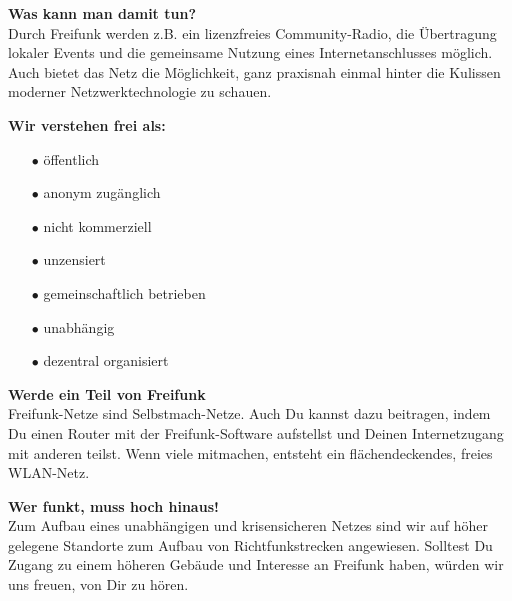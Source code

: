 \documentclass[a4paper]{article}
\begin{document}
\begin{Row}
    \begin{Cell}{5}
      \textbf{Was kann man damit tun?} \\
      Durch Freifunk werden z.B. ein lizenzfreies Community-Radio, die Übertragung
      lokaler Events und die gemeinsame Nutzung eines Internetanschlusses möglich.
      Auch bietet das Netz die Möglichkeit, ganz praxisnah einmal hinter die
      Kulissen moderner Netzwerktechnologie zu schauen.
    \end{Cell}
    \begin{Cell}{4}
      \textbf{Wir verstehen frei als:} \vspace*{-0.18cm}
	    \begin{itemize}
        \item[\textcolor{freifunkpink}{\Large$\bullet$}] öffentlich \vspace*{-0.3cm}
        \item[\textcolor{freifunkpink}{\Large$\bullet$}] anonym zugänglich \vspace*{-0.3cm}
        \item[\textcolor{freifunkpink}{\Large$\bullet$}] nicht kommerziell \vspace*{-0.3cm}
        \item[\textcolor{freifunkpink}{\Large$\bullet$}] unzensiert \vspace*{-0.3cm}
        \item[\textcolor{freifunkpink}{\Large$\bullet$}] gemeinschaftlich betrieben\vspace*{-0.3cm}
        \item[\textcolor{freifunkpink}{\Large$\bullet$}] unabhängig\vspace*{-0.3cm}
        \item[\textcolor{freifunkpink}{\Large$\bullet$}] dezentral organisiert
    	\end{itemize}
    \end{Cell}
\end{Row}

\newpage
\thispagestyle{empty}

\begin{Row}
  \begin{Cell}{5}
    \textbf{Werde ein Teil von Freifunk} \\
    Freifunk-Netze sind Selbstmach-Netze. Auch Du kannst dazu beitragen, indem Du
    einen Router mit der Freifunk-Software aufstellst und Deinen Internetzugang
    mit anderen teilst. Wenn viele mitmachen, entsteht ein flächendeckendes,
    freies WLAN-Netz.
  \end{Cell}
  \begin{Cell}{5}
    \textbf{Wer funkt, muss hoch hinaus!}\\
    Zum Aufbau eines unabhängigen und krisensicheren Netzes sind wir auf höher
    gelegene Standorte zum Aufbau von Richtfunkstrecken angewiesen. Solltest Du
    Zugang zu einem höheren Gebäude und Interesse an Freifunk haben, würden wir
    uns freuen, von Dir zu hören.
  \end{Cell}
\end{Row}
\end{document}

